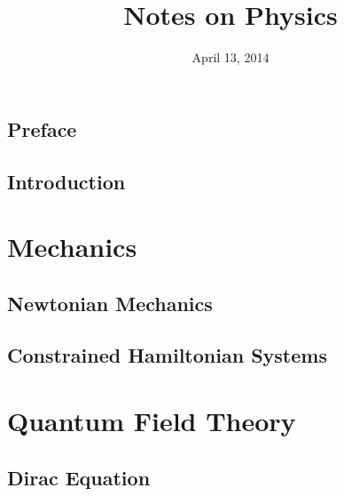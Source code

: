 \documentclass[oneside]{book}
\title{Notes on Physics}
\date{April 13, 2014}
\begin{document}
\frontmatter
\hypersetup{pageanchor=false}
\maketitle
\nocite{*}
\chapter{Preface}
\hypersetup{pageanchor=true}


\tableofcontents

\mainmatter
\chapter{Introduction}


\part{Mechanics}
\chapter{Newtonian Mechanics}



\chapter{Constrained Hamiltonian Systems}


\part{Quantum Field Theory}
\chapter{Dirac Equation}


\backmatter
\appendix
\printbibliography[heading=bibintoc]
\end{document}
